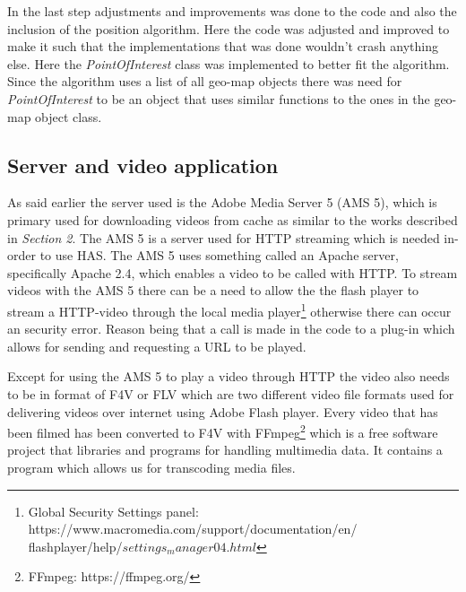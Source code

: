 \documentclass[9pt,a4paper]{acmproc}
\begin{document}
In the last step adjustments and improvements was done to the code and also the inclusion of the position algorithm. Here the code was adjusted and improved to make it such that the implementations that was done wouldn't crash anything else. Here the \textit{PointOfInterest} class was implemented to better fit the algorithm. Since the algorithm uses a list of all geo-map objects there was need for \textit{PointOfInterest} to be an object that uses similar functions to the ones in the geo-map object class. 



\subsection{Server and video application}

As said earlier the server used is the Adobe Media Server 5 (AMS 5), which is primary used for downloading videos from cache as similar to the works described in \textit{Section 2}. The AMS 5 is a server used for HTTP streaming which is needed in-order to use HAS. The AMS 5 uses something called an Apache server, specifically Apache 2.4, which enables a video to be called with HTTP. To stream videos with the AMS 5 there can be a need to allow the the flash player to stream a HTTP-video through the local media player\footnote{Global Security Settings panel: https://www.macromedia.com/support/documentation/en/ \\flashplayer/help/$settings_manager04.html$} otherwise there can occur an security error. Reason being that a call is made in the code to a plug-in which allows for sending and requesting a URL to be played.

Except for using the AMS 5 to play a video through HTTP the video also needs to be in format of F4V or FLV which are two different video file formats used for delivering videos over internet using Adobe Flash player. Every video that has been filmed has been converted to F4V with FFmpeg\footnote{FFmpeg: https://ffmpeg.org/} which is a free software project that libraries and programs for handling multimedia data. It contains a program which allows us for transcoding media files.
\end{document}

